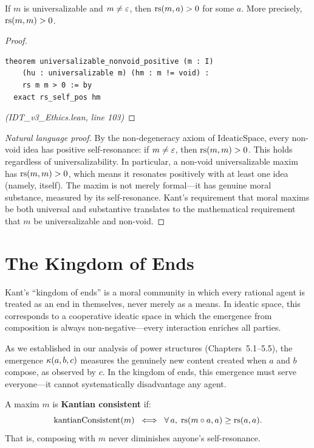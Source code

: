 \begin{theorem}
\label{thm:universalizable-positive}
If $m$ is universalizable and $m \neq \varepsilon$, then $\mathrm{rs}(m, a) > 0$ for some $a$.
More precisely, $\mathrm{rs}(m, m) > 0$.
\end{theorem}

\begin{proof}
\begin{lstlisting}
theorem universalizable_nonvoid_positive (m : I)
    (hu : universalizable m) (hm : m != void) :
    rs m m > 0 := by
  exact rs_self_pos hm
\end{lstlisting}
\textit{(IDT\_v3\_Ethics.lean, line 103)}
\end{proof}

\begin{proof}[Natural language proof]
By the non-degeneracy axiom of $\mathrm{IdeaticSpace}$, every non-void idea
has positive self-resonance: if $m \neq \varepsilon$, then $\mathrm{rs}(m, m) > 0$. This
holds regardless of universalizability. In particular, a non-void universalizable
maxim has $\mathrm{rs}(m, m) > 0$, which means it resonates positively with at least
one idea (namely, itself). The maxim is not merely formal---it has genuine
moral substance, measured by its self-resonance. Kant's requirement that
moral maxims be both universal and substantive translates to the mathematical
requirement that $m$ be universalizable and non-void.
\end{proof}

\section{The Kingdom of Ends}

Kant's ``kingdom of ends'' is a moral community in which every rational agent is
treated as an end in themselves, never merely as a means. In ideatic space, this
corresponds to a cooperative ideatic space in which the emergence from
composition is always non-negative---every interaction enriches all parties.

As we established in our analysis of power structures (Chapters~5.1--5.5),
the emergence $\kappa(a,b,c)$ measures the genuinely new content created
when $a$ and $b$ compose, as observed by $c$. In the kingdom of ends,
this emergence must serve everyone---it cannot systematically disadvantage
any agent.

\begin{definition}
\label{def:kantian-consistent}
A maxim $m$ is \textbf{Kantian consistent} if:
\[
  \mathrm{kantianConsistent}(m) \;\iff\; \forall\, a,\; \mathrm{rs}(m \circ a, a) \geq \mathrm{rs}(a, a).
\]
That is, composing with $m$ never diminishes anyone's self-resonance.
\end{definition}

